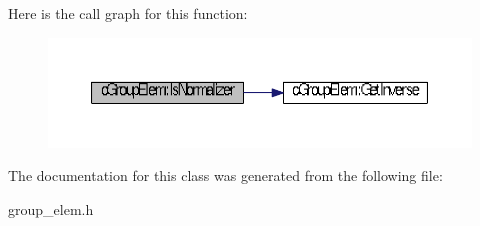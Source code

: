 \-Here is the call graph for this function\-:
\nopagebreak
\begin{figure}[H]
\begin{center}
\leavevmode
\includegraphics[width=350pt]{classcGroupElem_ab01a807aff26daecd39cea6837b01e8e_cgraph}
\end{center}
\end{figure}




\-The documentation for this class was generated from the following file\-:\begin{DoxyCompactItemize}
\item 
group\-\_\-elem.\-h\end{DoxyCompactItemize}
